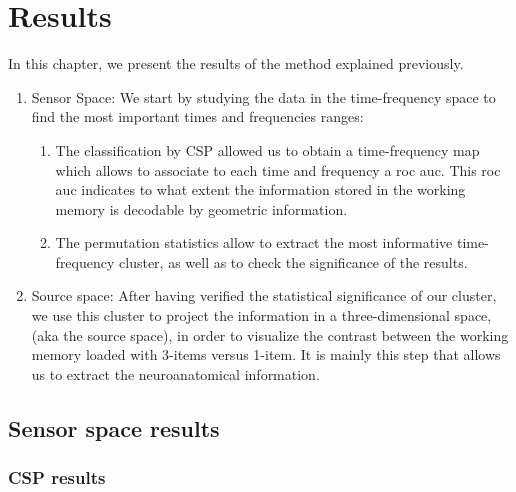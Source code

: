 \chapter{Results}

In this chapter, we present the results of the method explained previously.

\begin{enumerate}
    \item Sensor Space: We start by studying the data in the time-frequency space to find the most important times and frequencies ranges:
    \begin{enumerate}
        \item The classification by CSP allowed us to obtain a time-frequency map which allows to associate to each time and frequency a roc auc. This roc auc indicates to what extent the information stored in the working memory is decodable by geometric information.
        \item The permutation statistics allow to extract the most informative time-frequency cluster, as well as to check the significance of the results.
    \end{enumerate}
    
    \item Source space: After having verified the statistical significance of our cluster, we use this cluster to project the information in a three-dimensional space, (aka the source space), in order to visualize the contrast between the working memory loaded with 3-items versus 1-item. It is mainly this step that allows us to extract the neuroanatomical information.
\end{enumerate}

\section{Sensor space results}

\subsection{CSP results}



